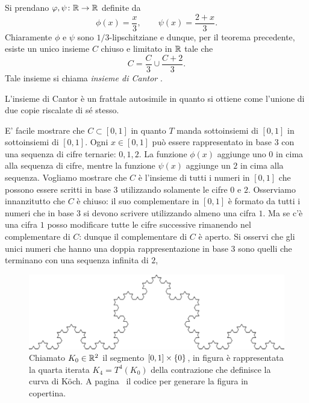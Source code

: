 \begin{example}
  \label{ex:insieme_Cantor}%
Si prendano $\varphi, \psi\colon {\mathbb R} \to {\mathbb R}$ definite da
\[
  \phi(x) = \frac{x}{3}, \qquad
  \psi(x) = \frac{2+x}{3}.
\]
Chiaramente $\phi$ e $\psi$ sono $1/3$-lipschitziane e dunque, per il teorema precedente, esiste un unico insieme $C$ chiuso e limitato in ${\mathbb R}$ tale che
\[
  C = \frac{C}{3} \cup \frac{C+2}{3}.
\]
Tale insieme si chiama \emph{insieme di Cantor}%
.

L'insieme di Cantor è un frattale autosimile in quanto si ottiene come l'unione di due copie riscalate di sé stesso.

E' facile mostrare che $C\subset [0,1]$ in quanto $T$ manda sottoinsiemi di $[0,1]$ in sottoinsiemi di $[0,1]$.
Ogni $x\in [0,1]$ può essere rappresentato in base $3$ con una sequenza di cifre ternarie: $0,1,2$. La funzione $\phi(x)$ aggiunge uno $0$ in cima alla sequenza di cifre, mentre la funzione $\psi(x)$ aggiunge un $2$ in cima alla sequenza.
Vogliamo mostrare che $C$ è l'insieme di tutti i numeri in $[0,1]$ che possono essere scritti in base $3$ utilizzando solamente le cifre $0$ e $2$. Osserviamo innanzitutto che $C$ è chiuso: il suo complementare in $[0,1]$ è formato da tutti i numeri che in base $3$ si devono scrivere utilizzando almeno una cifra $1$. Ma se c'è una cifra $1$ posso modificare tutte le cifre successive rimanendo nel complementare di $C$: dunque il complementare di $C$ è aperto. Si osservi che gli unici numeri che hanno una doppia rappresentazione in base $3$ sono quelli che terminano con una sequenza infinita di $2$,
\end{example}

\begin{figure}
\centering\includegraphics[width=1.0\textwidth]{koch_picture}
\caption{
Chiamato $K_0 \in {\mathbb R}^2$ il segmento $[0,1]\times {\left\{ 0 \right\}}$,
in figura è rappresentata
la quarta iterata $K_4 = T^4(K_0)$ della contrazione che definisce la curva di K{\"o}ch.
A pagina~\pageref{code:Koch} il codice per generare la figura in copertina.
%
}
\label{fig:koch}
\end{figure}

